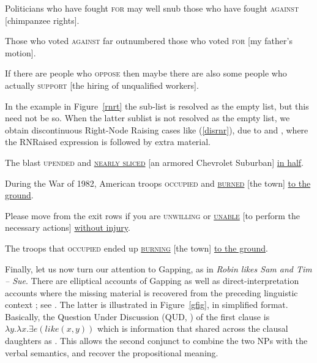 \documentclass[output=paper
                ,modfonts
                ,nonflat
	        ,collection
	        ,collectionchapter
	        ,collectiontoclongg
 	        ,biblatex
                ,babelshorthands
                ,newtxmath
                ,draftmode
                ,colorlinks, citecolor=brown
]{./langsci/langscibook}
\begin{document}
{\begin{exe}
\begin{xlista}
\ex Politicians who have fought \textsc{for} may well snub those
 who have fought \textsc{against} [chimpanzee rights]. \\
\citep[]{postal94}\addpages

\ex Those who voted \textsc{against} far outnumbered those who
voted  \textsc{for} [my father's motion].\\
\citep[1344]{rodney}


\ex If there are people who \textsc{oppose} then maybe there are also some
  people who actually \textsc{support}  [the hiring of unqualified
  workers].\\
  \citep[]{chavesrnr}

\end{xlista}


\end{exe}




In the example in Figure~\ref{rnrt}  the sub-list  is resolved as the empty list, but this need not be so. When the latter sublist is not resolved as the empty list, we obtain discontinuous Right-Node Raising cases like (\ref{disrnr}), due to  \citet[238--240]{Whitman:09}
and \citet[868]{chavesrnr}, where the RNRaised expression is followed by extra material. 
\begin{exe}
\ex \begin{xlista}
\ex The blast \textsc{upended} and \underline{\textsc{nearly sliced}} [an armored Chevrolet Suburban] \underline{in half}.

\ex During the War of 1982, American troops
\textsc{occupied}  and \underline{\textsc{burned}} [the town] \underline{to the ground}.

\ex Please move from the exit rows if you are \textsc{unwilling} or \underline{\textsc{unable}}
 [to perform the necessary actions] \underline{without injury}.

\ex The troops that \textsc{occupied} ended up \underline{\textsc{burning}}
[the town] \underline{to the ground}.



\end{xlista}\label{disrnr}
\end{exe}



Finally, let us now turn our attention to Gapping, as in 
\emph{Robin likes Sam and Tim -- Sue}.
There are elliptical accounts of Gapping  \citep{chaves06} as well as direct-interpretation accounts where the missing material is recovered from the preceding linguistic context  \citep{Mouret:06,Abeille:Blbie:Mouret:14,sangheepark}; see . The latter is illustrated in Figure~\ref{gfig}, in simplified format. Basically, the Question Under Discussion (QUD, \citealp{roberts96}) of the first clause is $\lambda y.\lambda x. \exists e(like(x,y))$ which is information that shared across the clausal daughters as .
This allows the second conjunct to combine the two NPs with the verbal semantics, and recover the propositional meaning.

}
\end{document}
